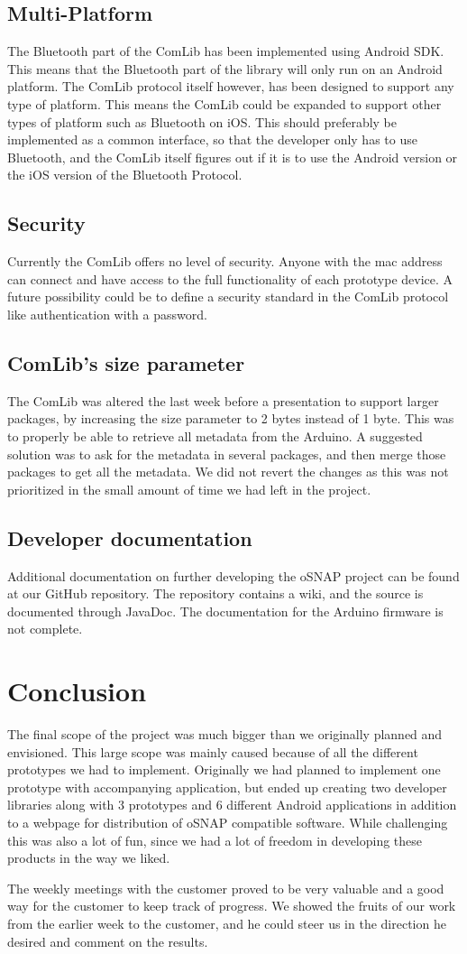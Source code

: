 \subsection{Multi-Platform}
The Bluetooth part of the ComLib has been implemented using Android SDK. This means that 
the Bluetooth part of the library will only run on an Android platform. The ComLib protocol
itself however, has been designed to support any type of platform. This means the ComLib
could be expanded to support other types of platform such as Bluetooth on iOS. This
should preferably be implemented as a common interface, so that the developer only has to use
Bluetooth, and the ComLib itself figures out if it is to use the Android version or the iOS version of
the Bluetooth Protocol.

\subsection{Security}
Currently the ComLib offers no level of security. Anyone with the mac address can connect
and have access to the full functionality of each prototype device. A future possibility could
be to define a security standard in the ComLib protocol like authentication with a password.

\subsection{ComLib's size parameter}
The ComLib was altered the last week before a presentation to support larger packages, by increasing the size parameter to 2 bytes instead of 1 byte. This was to properly
be able to retrieve all metadata from the Arduino. A suggested solution was to ask for the metadata
in several packages, and then merge those packages to get all the metadata. We did not revert the changes
as this was not prioritized in the small amount of time we had left in the project.

\subsection{Developer documentation}
Additional documentation on further developing the oSNAP project can be found at our GitHub repository\cite{link:github-osnap}.
The repository contains a wiki, and the source is documented through JavaDoc. The documentation for the Arduino firmware is not complete.

\section{Conclusion}
The final scope of the project was much bigger than we originally planned and envisioned. This large scope
was mainly caused because of all the different prototypes we had to implement. Originally we had planned
to implement one prototype with accompanying application, but ended up creating two developer libraries
along with 3 prototypes and 6 different Android applications in addition to a webpage for distribution of oSNAP
compatible software. While challenging this was also a lot of fun, since we had a lot of freedom in developing
these products in the way we liked.

The weekly meetings with the customer proved to be very valuable and
a good way for the customer to keep track of progress. We showed the fruits of our work from the earlier
week to the customer, and he could steer us in the direction he desired and comment on the results.
